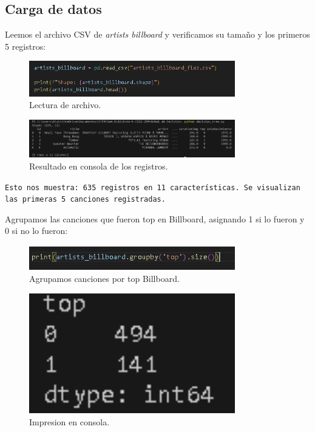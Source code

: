 \documentclass[a4paper,12pt]{article}
\begin{document}
\subsection{Carga de datos}
Leemos el archivo CSV de \textit{artists billboard} y verificamos su tamaño y los primeros 5 registros:

\begin{figure}[H]
    \centering
    \includegraphics[width=0.8\textwidth]{2.png}
    \caption{Lectura de archivo.}
    \label{fig:file_reading}
\end{figure}

\begin{figure}[H]
    \centering
    \includegraphics[width=0.8\textwidth]{3.png}
    \caption{Resultado en consola de los registros.}
    \label{fig:console_output}
\end{figure}

\texttt{Esto nos muestra: 635 registros en 11 características. Se visualizan las primeras 5 canciones registradas.}


Agrupamos las canciones que fueron top en Billboard, asignando 1 si lo fueron y 0 si no lo fueron:

\begin{figure}[H]
    \centering
    \includegraphics[width=0.8\textwidth]{4.png}
    \caption{Agrupamos canciones por top Billboard.}
\end{figure}

\begin{figure}[H]
    \centering
    \includegraphics[width=0.8\textwidth]{5.png}
    \caption{Impresion en consola.}
\end{figure}
\end{document}
